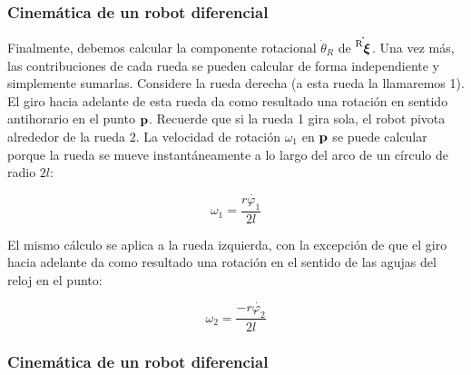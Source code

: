 \begin{frame}
    \frametitle{Cinemática de un robot diferencial}
    \small

    Finalmente, debemos calcular la componente rotacional $\dot{\theta}_{R}$ de $\dot{\prescript{\mathrm{R}}{}{{\boldsymbol{\mathbf{\xi}}}_\mathrm{}}}$. Una vez más, las contribuciones de cada rueda se pueden calcular de forma independiente y simplemente sumarlas. Considere la rueda derecha (a esta rueda la llamaremos 1). El giro hacia adelante de esta rueda da como resultado una rotación en sentido antihorario en el punto $\boldsymbol{\mathbf{p}}$. Recuerde que si la rueda 1 gira sola, el robot pivota alrededor de la rueda 2. La velocidad de rotación $\omega_{1}$ en $\boldsymbol{\mathbf{p}}$ se puede calcular porque la rueda se mueve instantáneamente a lo largo del arco de un círculo de radio $2l$:

    \begin{equation*}
        \omega_{1} = \dfrac{r\dot{\varphi_{1}}}{2l}
    \end{equation*}

    El mismo cálculo se aplica a la rueda izquierda, con la excepción de que el giro hacia adelante da como resultado una rotación en el sentido de las agujas del reloj en el punto:

    \begin{equation*}
        \omega_{2} = \dfrac{-r\dot{\varphi_{2}}}{2l}
    \end{equation*}
\end{frame}

\begin{frame}
    \frametitle{Cinemática de un robot diferencial}
    
    
    

\end{frame}
